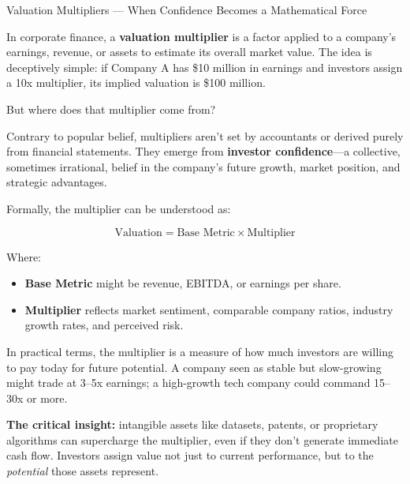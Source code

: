 \begin{HistoricalSidebar}{Valuation Multipliers --- When Confidence Becomes a Mathematical Force}

    In corporate finance, a \textbf{valuation multiplier} is a factor applied to a company’s earnings, revenue, or assets to estimate its overall market value. The idea is deceptively simple:  
    if Company A has \$10 million in earnings and investors assign a 10x multiplier, its implied valuation is \$100 million.  
    
    \medskip
    
    But where does that multiplier come from?
    
    \medskip
    
    Contrary to popular belief, multipliers aren’t set by accountants or derived purely from financial statements.  
    They emerge from \textbf{investor confidence}—a collective, sometimes irrational, belief in the company’s future growth, market position, and strategic advantages.
    
    \medskip
    
    Formally, the multiplier can be understood as:

    \medskip
    
    \[
    \text{Valuation} = \text{Base Metric} \times \text{Multiplier}
    \]

    \medskip
    
    Where:

    \medskip

    \begin{itemize}
        \item \textbf{Base Metric} might be revenue, EBITDA, or earnings per share.
        \item \textbf{Multiplier} reflects market sentiment, comparable company ratios, industry growth rates, and perceived risk.
    \end{itemize}
    
    \medskip
    
    In practical terms, the multiplier is a measure of how much investors are willing to pay today for future potential.  
    A company seen as stable but slow-growing might trade at 3--5x earnings; a high-growth tech company could command 15--30x or more.
    
    \medskip
    
    \textbf{The critical insight:} intangible assets like datasets, patents, or proprietary algorithms can supercharge the multiplier, even if they don’t generate immediate cash flow. Investors assign value not just to current performance, but to the \textit{potential} those assets represent.
    

\end{HistoricalSidebar}
